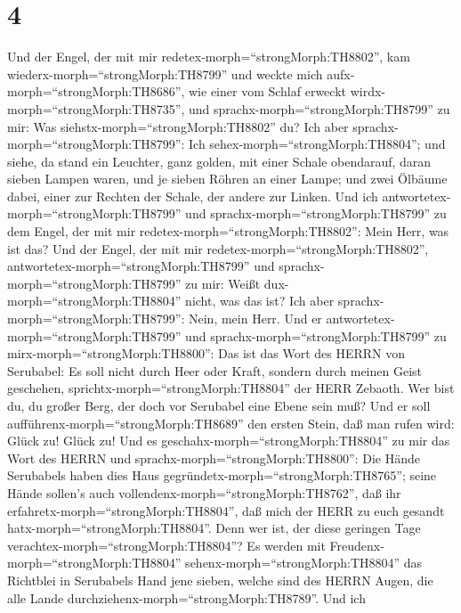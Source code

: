 \hypertarget{section-3}{%
\section{4}\label{section-3}}

 Und der Engel, der mit mir
redetex-morph=``strongMorph:TH8802'', kam
wiederx-morph=``strongMorph:TH8799'' und weckte mich
aufx-morph=``strongMorph:TH8686'', wie einer vom Schlaf erweckt
wirdx-morph=``strongMorph:TH8735'',  und
sprachx-morph=``strongMorph:TH8799'' zu mir: Was
siehstx-morph=``strongMorph:TH8802'' du? Ich aber
sprachx-morph=``strongMorph:TH8799'': Ich
sehex-morph=``strongMorph:TH8804''; und siehe, da stand ein Leuchter,
ganz golden, mit einer Schale obendarauf, daran sieben Lampen waren, und
je sieben Röhren an einer Lampe;  und zwei Ölbäume dabei,
einer zur Rechten der Schale, der andere zur Linken.  Und
ich antwortetex-morph=``strongMorph:TH8799'' und
sprachx-morph=``strongMorph:TH8799'' zu dem Engel, der mit mir
redetex-morph=``strongMorph:TH8802'': Mein Herr, was ist das?
 Und der Engel, der mit mir
redetex-morph=``strongMorph:TH8802'',
antwortetex-morph=``strongMorph:TH8799'' und
sprachx-morph=``strongMorph:TH8799'' zu mir: Weißt
dux-morph=``strongMorph:TH8804'' nicht, was das ist? Ich aber
sprachx-morph=``strongMorph:TH8799'': Nein, mein Herr.  Und
er antwortetex-morph=``strongMorph:TH8799'' und
sprachx-morph=``strongMorph:TH8799'' zu
mirx-morph=``strongMorph:TH8800'': Das ist das Wort des HERRN von
Serubabel: Es soll nicht durch Heer oder Kraft, sondern durch meinen
Geist geschehen, sprichtx-morph=``strongMorph:TH8804'' der HERR Zebaoth.
 Wer bist du, du großer Berg, der doch vor Serubabel eine
Ebene sein muß? Und er soll aufführenx-morph=``strongMorph:TH8689'' den
ersten Stein, daß man rufen wird: Glück zu! Glück zu!  Und
es geschahx-morph=``strongMorph:TH8804'' zu mir das Wort des HERRN und
sprachx-morph=``strongMorph:TH8800'':  Die Hände Serubabels
haben dies Haus gegründetx-morph=``strongMorph:TH8765''; seine Hände
sollen's auch vollendenx-morph=``strongMorph:TH8762'', daß ihr
erfahretx-morph=``strongMorph:TH8804'', daß mich der HERR zu euch
gesandt hatx-morph=``strongMorph:TH8804''.  Denn wer ist,
der diese geringen Tage verachtex-morph=``strongMorph:TH8804''? Es
werden mit Freudenx-morph=``strongMorph:TH8804''
sehenx-morph=``strongMorph:TH8804'' das Richtblei in Serubabels Hand
jene sieben, welche sind des HERRN Augen, die alle Lande
durchziehenx-morph=``strongMorph:TH8789''.  Und ich
